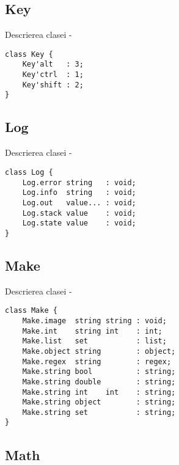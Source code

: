 \subsection{{\color{orange} Key}}

\noindent Descrierea clasei  -
\begin{lstlisting}[numbers=none]
class Key {
	Key'alt   : 3;
	Key'ctrl  : 1;
	Key'shift : 2;
}
\end{lstlisting}

\subsection{{\color{orange} Log}}

\noindent Descrierea clasei  -
\begin{lstlisting}[numbers=none]
class Log {
	Log.error string   : void;
	Log.info  string   : void;
	Log.out   value... : void;
	Log.stack value    : void;
	Log.state value    : void;
}
\end{lstlisting}

\subsection{{\color{orange} Make}}

\noindent Descrierea clasei  -
\begin{lstlisting}[numbers=none]
class Make {
	Make.image  string string : void;
	Make.int    string int    : int;
	Make.list   set           : list;
	Make.object string        : object;
	Make.regex  string        : regex;
	Make.string bool          : string;
	Make.string double        : string;
	Make.string int    int    : string;
	Make.string object        : string;
	Make.string set           : string;
}
\end{lstlisting}

\subsection{{\color{orange} Math}}

